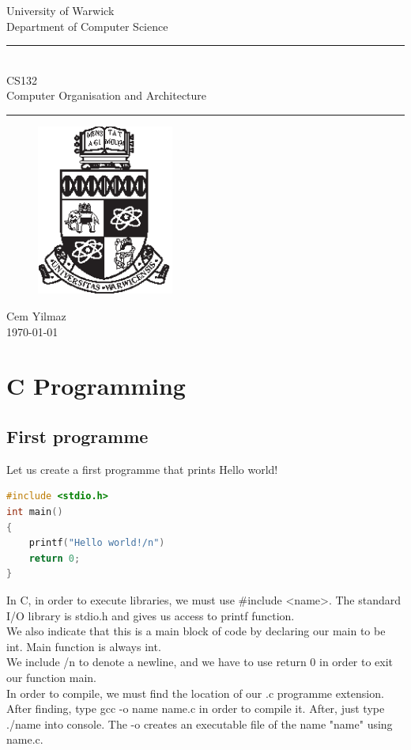 \documentclass[a4paper]{article}
\theoremstyle{plain}
\theoremstyle{definition}
\theoremstyle{remark}
\begin{document}
\begin{titlepage}
\begin{center}
\large
University of Warwick \\
Department of Computer Science \\
\huge
\vspace{50mm}
\rule{\linewidth}{0.5pt} \\
CS132 \\
\vspace{5mm}
\Large
Computer Organisation and Architecture
\rule{\linewidth}{0.5pt}
\vspace{5mm}
\begin{figure}[H]
\centering
\includegraphics[width=0.4\textwidth]{crest_black.eps}
\end{figure}
\vspace{37mm}
Cem Yilmaz\\
\today
\end{center}
\end{titlepage}
\tableofcontents
\newpage

\section{C Programming}
\subsection{First programme}
Let us create a first programme that prints Hello world!
\begin{lstlisting}[language = C]
#include <stdio.h>
int main()
{
	printf("Hello world!/n")
	return 0;
}
\end{lstlisting}
In C, in order to execute libraries, we must use #include <name>. The standard I/O library is stdio.h and gives us access to printf function. \\
We also indicate that this is a main block of code by declaring our main to be int. Main function is always int.\\
We include /n to denote a newline, and we have to use return 0 in order to exit our function main.\\
In order to compile, we must find the location of our .c programme extension. After finding, type gcc -o name name.c in order to compile it. After, just type ./name into console. The -o creates an executable file of the name "name" using name.c.
\end{document}

